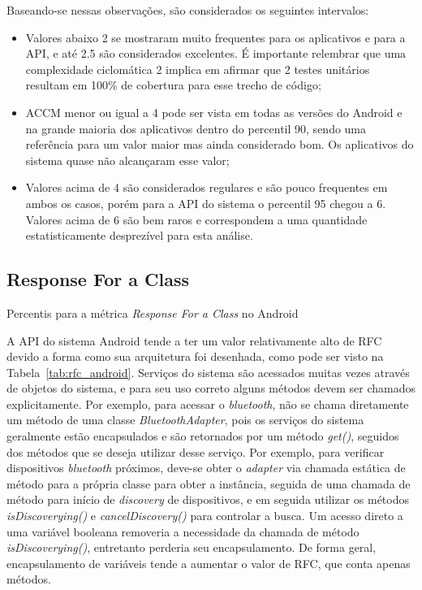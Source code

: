 Baseando-se nessas observações, são considerados os seguintes intervalos:

\begin{itemize}
\item Valores abaixo 2 se mostraram muito frequentes para os aplicativos e para a API, e até 2.5 são considerados excelentes. É importante relembrar que uma complexidade ciclomática 2 implica em afirmar que 2 testes unitários resultam em 100\% de cobertura para esse trecho de código;
\item ACCM menor ou igual a 4 pode ser vista em todas as versões do Android e na grande maioria dos aplicativos dentro do percentil 90, sendo uma referência para um valor maior mas ainda considerado bom. Os aplicativos do sistema quase não alcançaram esse valor;
\item Valores acima de 4 são considerados regulares e são pouco frequentes em ambos os casos, porém para a API do sistema o percentil 95 chegou a 6. Valores acima de 6 são bem raros e correspondem a uma quantidade estatisticamente desprezível para esta análise.
\end{itemize}

\subsection{Response For a Class}

\begin{table}[!htb]
\centering
{}

\caption{Percentis para a métrica \textit{Response For a Class} no Android}
\label{tab:rfc_android}
\end{table}

A API do sistema Android tende a ter um valor relativamente alto de RFC devido a forma como sua arquitetura foi desenhada, como pode ser visto na Tabela~\ref{tab:rfc_android}. Serviços do sistema são acessados muitas vezes através de objetos do sistema, e para seu uso correto alguns métodos devem ser chamados explicitamente. Por exemplo, para acessar o \textit{bluetooth}, não se chama diretamente um método de uma classe \textit{BluetoothAdapter}, pois os serviços do sistema geralmente estão encapsulados e são retornados por um método \textit{get()}, seguidos dos métodos que se deseja utilizar desse serviço. Por exemplo, para verificar dispositivos \textit{bluetooth} próximos, deve-se obter o \textit{adapter} via chamada estática de método para a própria classe para obter a instância, seguida de uma chamada de método para início de \textit{discovery} de dispositivos, e em seguida utilizar os métodos \textit{isDiscoverying()} e \textit{cancelDiscovery()} para controlar a busca. Um acesso direto a uma variável booleana removeria a necessidade da chamada de método \textit{isDiscoverying()}, entretanto perderia seu encapsulamento. De forma geral, encapsulamento de variáveis tende a aumentar o valor de RFC, que conta apenas métodos. 

